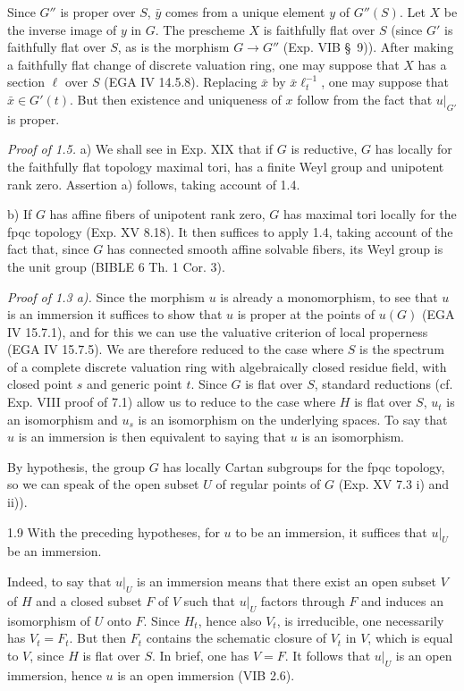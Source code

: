 Since $G''$ is proper over $S$, $\bar y$ comes from a unique element $y$ of $G''(S)$. Let $X$ be the inverse image of $y$ in $G$. The prescheme $X$ is faithfully flat over $S$ (since $G'$ is faithfully flat over $S$, as is the morphism $G\to G''$ (Exp. VIB \S\ 9)). After making a faithfully flat change of discrete valuation ring, one may suppose that $X$ has a section $\ell$ over $S$ (EGA IV 14.5.8). Replacing $\bar x$ by $\bar x\ell_t^{-1}$, one may suppose that $\bar x\in G'(t)$. But then existence and uniqueness of $x$ follow from the fact that $u|_{G'}$ is proper.

\par\noindent\emph{Proof of 1.5.}
\noindent a) We shall see in Exp. XIX that if $G$ is reductive, $G$ has locally for the faithfully flat topology maximal tori, has a finite Weyl group and unipotent rank zero. Assertion a) follows, taking account of 1.4.

\noindent b) If $G$ has affine fibers of unipotent rank zero, $G$ has maximal tori locally for the fpqc topology (Exp. XV 8.18). It then suffices to apply 1.4, taking account of the fact that, since $G$ has connected smooth affine solvable fibers, its Weyl group is the unit group (BIBLE 6 Th. 1 Cor. 3).

\par\noindent\emph{Proof of 1.3 a).}
Since the morphism $u$ is already a monomorphism, to see that $u$ is an immersion it suffices to show that $u$ is proper at the points of $u(G)$ (EGA IV 15.7.1), and for this we can use the valuative criterion of local properness (EGA IV 15.7.5). We are therefore reduced to the case where $S$ is the spectrum of a complete discrete valuation ring with algebraically closed residue field, with closed point $s$ and generic point $t$. Since $G$ is flat over $S$, standard reductions (cf. Exp. VIII proof of 7.1) allow us to reduce to the case where $H$ is flat over $S$, $u_t$ is an isomorphism and $u_s$ is an isomorphism on the underlying spaces. To say that $u$ is an immersion is then equivalent to saying that $u$ is an isomorphism.

By hypothesis, the group $G$ has locally Cartan subgroups for the fpqc topology, so we can speak of the open subset $U$ of regular points of $G$ (Exp. XV 7.3 i) and ii)).
\begin{lemma}{1.9}\label{XVI.1.9}
With the preceding hypotheses, for $u$ to be an immersion, it suffices that $u|_U$ be an immersion.
\end{lemma}
Indeed, to say that $u|_U$ is an immersion means that there exist an open subset $V$ of $H$ and a closed subset $F$ of $V$ such that $u|_U$ factors through $F$ and induces an isomorphism of $U$ onto $F$. Since $H_t$, hence also $V_t$, is irreducible, one necessarily has $V_t=F_t$. But then $F_t$ contains the schematic closure of $V_t$ in $V$, which is equal to $V$, since $H$ is flat over $S$. In brief, one has $V=F$. It follows that $u|_U$ is an open immersion, hence $u$ is an open immersion (VIB 2.6).

